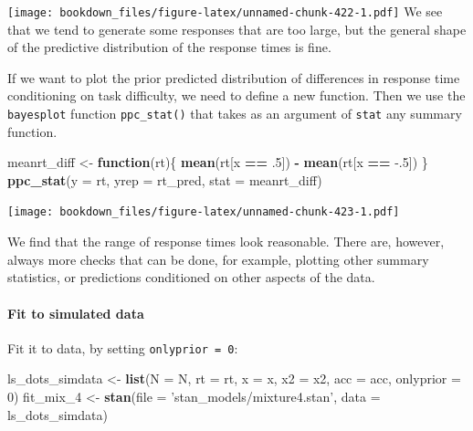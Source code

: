 \documentclass[12pt,]{krantz}
\newenvironment{Shaded}{\begin{snugshade}}{\end{snugshade}}
\newcommand{\KeywordTok}[1]{\textcolor[rgb]{0.13,0.29,0.53}{\textbf{#1}}}
\newcommand{\DataTypeTok}[1]{\textcolor[rgb]{0.13,0.29,0.53}{#1}}
\newcommand{\DecValTok}[1]{\textcolor[rgb]{0.00,0.00,0.81}{#1}}
\newcommand{\FloatTok}[1]{\textcolor[rgb]{0.00,0.00,0.81}{#1}}
\newcommand{\StringTok}[1]{\textcolor[rgb]{0.31,0.60,0.02}{#1}}
\newcommand{\ControlFlowTok}[1]{\textcolor[rgb]{0.13,0.29,0.53}{\textbf{#1}}}
\newcommand{\OperatorTok}[1]{\textcolor[rgb]{0.81,0.36,0.00}{\textbf{#1}}}
\newcommand{\NormalTok}[1]{#1}
\let\oldparagraph\paragraph
\renewcommand{\paragraph}[1]{\oldparagraph{#1}\mbox{}}
\theoremstyle{definition}
\theoremstyle{definition}
\theoremstyle{definition}
\theoremstyle{remark}
\begin{document}
\texttt{[image: bookdown\_files/figure-latex/unnamed-chunk-422-1.pdf]} We
see that we tend to generate some responses that are too large, but the
general shape of the predictive distribution of the response times is
fine.

If we want to plot the prior predicted distribution of differences in
response time conditioning on task difficulty, we need to define a new
function. Then we use the \texttt{bayesplot} function
\texttt{ppc\_stat()} that takes as an argument of \texttt{stat} any
summary function.

\begin{Shaded}
\begin{Highlighting}[]
\NormalTok{meanrt_diff <-}\StringTok{ }\ControlFlowTok{function}\NormalTok{(rt)\{}
  \KeywordTok{mean}\NormalTok{(rt[x }\OperatorTok{==}\StringTok{ }\FloatTok{.5}\NormalTok{]) }\OperatorTok{-}\StringTok{ }\KeywordTok{mean}\NormalTok{(rt[x }\OperatorTok{==}\StringTok{ }\FloatTok{-.5}\NormalTok{])}
\NormalTok{\}}
\KeywordTok{ppc_stat}\NormalTok{(}\DataTypeTok{y =}\NormalTok{ rt, }\DataTypeTok{yrep =}\NormalTok{ rt_pred, }\DataTypeTok{stat =}\NormalTok{ meanrt_diff) }
\end{Highlighting}
\end{Shaded}

\texttt{[image: bookdown\_files/figure-latex/unnamed-chunk-423-1.pdf]}

We find that the range of response times look reasonable. There are,
however, always more checks that can be done, for example, plotting
other summary statistics, or predictions conditioned on other aspects of
the data.

\paragraph{Fit to simulated data}\label{fit-to-simulated-data}

Fit it to data, by setting \texttt{onlyprior\ =\ 0}:

\begin{Shaded}
\begin{Highlighting}[]
\NormalTok{ls_dots_simdata <-}\StringTok{ }\KeywordTok{list}\NormalTok{(}\DataTypeTok{N =}\NormalTok{ N,}
                        \DataTypeTok{rt =}\NormalTok{ rt,}
                        \DataTypeTok{x =}\NormalTok{ x,}
                        \DataTypeTok{x2 =}\NormalTok{ x2,}
                        \DataTypeTok{acc =}\NormalTok{ acc,}
                        \DataTypeTok{onlyprior =} \DecValTok{0}\NormalTok{) }
\NormalTok{fit_mix_}\DecValTok{4}\NormalTok{ <-}\StringTok{ }\KeywordTok{stan}\NormalTok{(}\DataTypeTok{file =} \StringTok{'stan_models/mixture4.stan'}\NormalTok{,}
                  \DataTypeTok{data =}\NormalTok{ ls_dots_simdata) }
\end{Highlighting}
\end{Shaded}
\end{document}
